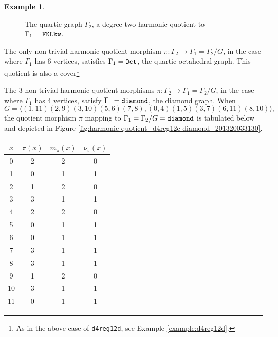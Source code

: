 \documentclass[12pt,letterpaper]{article}
\theoremstyle{definition}
\newtheorem{example}[theorem]{Example}
\begin{document}
\begin{example}
{\begin{figure}[H]
\begin{minipage}{\textwidth}
\begin{center}
%
\end{center}
\end{minipage}
\caption{The quartic graph $\Gamma_2$, a degree two harmonic quotient to $\Gamma_1={\tt FKLkw}$.}
\label{fig:harmonic-quotient_d4reg12e+FKLkw}
\end{figure}

The only non-trivial harmonic quotient morphism
$\pi: \Gamma_2\to \Gamma_1=\Gamma_2/G$, in the case where
$\Gamma_1$ has $6$ vertices, satisfies $\Gamma_1={\tt Oct}$,
the quartic octahedral graph.
This quotient is also a cover\footnote{As in the above case of
{\tt d4reg12d}, see Example \ref{example:d4reg12d}.}


The $3$ non-trivial harmonic quotient morphisms
$\pi: \Gamma_2\to \Gamma_1=\Gamma_2/G$, in the case where
$\Gamma_1$ has $4$ vertices, satisfy $\Gamma_1={\tt diamond}$,
the diamond graph.
When
\[
G = \langle 
(1,11)(2,9)(3,10)(5,6)(7,8),
(0,4)(1,5)(3,7)(6,11)(8,10)\rangle ,
\]
the quotient morphism $\pi$ mapping to
$\Gamma_1=\Gamma_2/G ={\tt diamond}$
is tabulated below
and  depicted in Figure \ref{fig:harmonic-quotient_d4reg12e-diamond_201320033130}.

\begin{center}
\begin{tabular}{c|c|c|c}  
  $x$ & $\pi(x)$ & $m_\pi(x)$ & $\nu_\pi(x)$   \\ \hline
  0   &    2   &        2         &  0  \\ 
  1   &    0   &        1         &  1  \\ 
  2   &    1   &        2         &  0  \\ 
  3   &    3   &        1         &  1   \\
  4   &    2   &        2         &  0   \\
  5   &    0   &        1         &  1   \\
  6   &    0   &        1         &  1   \\
  7   &    3   &        1         &  1   \\
  8   &    3   &        1         &  1   \\
  9   &    1   &        2         &  0  \\   
  10  &    3  &         1         &  1  \\
  11  &    0   &        1         &  1  \\  
\end{tabular}
\end{center}

}
\end{example}
\end{document}
